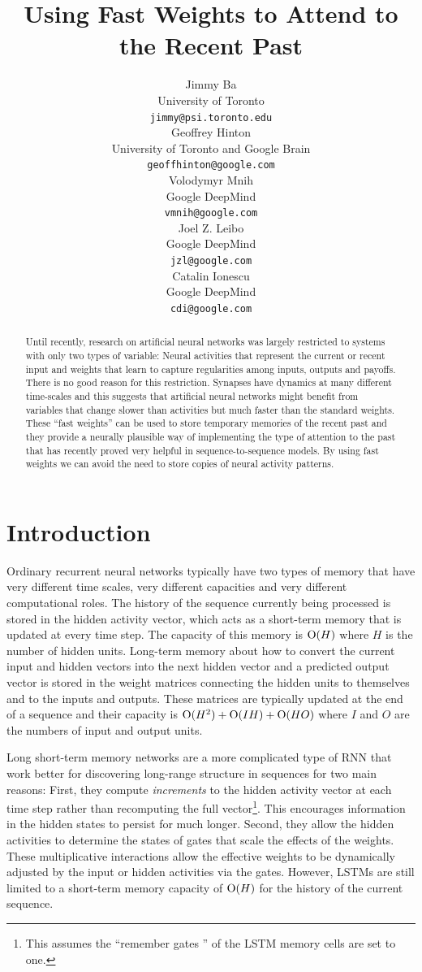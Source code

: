 \documentclass{article}
\title{Using Fast Weights to Attend to the Recent Past}
\author{
Jimmy Ba \\
University of Toronto \\
{\small \texttt{jimmy@psi.toronto.edu}} \\
\And
Geoffrey Hinton \\
University of Toronto and Google Brain\\
{\small \texttt{geoffhinton@google.com}} \\
\AND
Volodymyr Mnih \\
Google DeepMind \\
{\small \texttt{vmnih@google.com} } \\
\And
Joel Z. Leibo \\
Google DeepMind \\
{\small \texttt{jzl@google.com} } \\
\And
Catalin Ionescu \\
Google DeepMind \\
{\small \texttt{cdi@google.com} } \\
}
\begin{document}
\maketitle
\vspace{-0.2in}
\begin{abstract}
Until recently, research on artificial neural networks was largely restricted to systems with only two types of variable: Neural activities that represent the current or recent input and weights that learn to capture regularities among inputs, outputs and payoffs. There is no good reason for this restriction. Synapses have dynamics at many different time-scales and this suggests that artificial neural networks might benefit from variables that change slower than activities but much faster than the standard weights.  These ``fast weights'' can be used to store temporary memories of the recent past and they provide a neurally plausible way of implementing the type of attention to the past that has recently proved very helpful in sequence-to-sequence models. By using fast weights we can avoid the need to store copies of neural activity patterns.  
\end{abstract}

\section{Introduction}
\label{sec:intro}

Ordinary recurrent neural networks typically have two types of memory that have very different time scales, very different capacities and very different computational roles.  The history of the sequence currently being processed is stored in the hidden activity vector, which acts as a short-term memory that is updated at every time step.  The capacity of this memory is ${\rm O} (H)$ where $H$ is the number of hidden units. Long-term memory about how to convert the current input and hidden vectors into the next hidden vector and a predicted output vector  is stored in the weight matrices connecting the hidden units to themselves and to the inputs and outputs. These matrices are typically updated at the end of a sequence and their capacity is ${\rm O}(H^2) + {\rm O} (IH) + {\rm O}(HO)$ where $I$ and $O$ are the numbers of input and output units.  

Long short-term memory networks \citep{hochreiter1997long} are a more complicated type of RNN that work better for discovering long-range structure in sequences for two main reasons: First, they compute {\it increments} to the hidden activity vector at each time step rather than recomputing the full vector\footnote{This assumes the ``remember gates '' of the LSTM memory cells are set to one.}. This encourages  information in the hidden states to persist for much longer. Second, they allow the hidden activities to determine the states of gates that scale the effects of the weights. These multiplicative interactions allow the effective weights to be dynamically adjusted by the input or hidden activities via the gates. However, LSTMs are still limited to a short-term memory capacity of ${\rm O}(H)$ for the history of the current sequence. 
\end{document}
